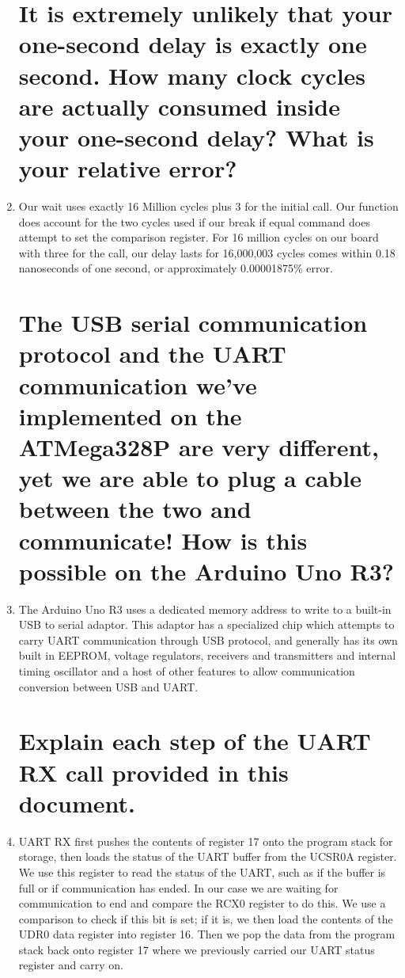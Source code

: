\documentclass[letterpaper,11pt]{texMemo} %
\begin{document}
\begin{enumerate}

\section{It is extremely unlikely that your one-second delay is exactly one second. How many clock
cycles are actually consumed inside your one-second delay? What is your relative error?}

\item Our wait uses exactly 16 Million cycles plus 3 for the initial call. Our function does account for the two cycles used if our break if equal command does attempt to set the comparison register. For 16 million cycles on our board with three for the call, our delay lasts for 16,000,003 cycles comes within 0.18 nanoseconds of one second, or approximately 0.00001875\% error.

\section{The USB serial communication protocol and the UART communication we’ve implemented
on the ATMega328P are very different, yet we are able to plug a cable between the two and
communicate! How is this possible on the Arduino Uno R3?}

\item The Arduino Uno R3 uses a dedicated memory address to write to a built-in USB to serial adaptor. This adaptor has a specialized chip which attempts to carry UART communication through USB protocol, and generally has its own built in EEPROM, voltage regulators, receivers and transmitters and internal timing oscillator and a host of other features to allow communication conversion between USB and UART.

\section{Explain each step of the UART RX call provided in this document.}

\item UART RX first pushes the contents of register 17 onto the program stack for storage, then loads the status of the UART buffer from the UCSR0A register. We use this register to read the status of the UART, such as if the buffer is full or if communication has ended. In our case we are waiting for communication to end and compare the RCX0 register to do this. We use a comparison to check if this bit is set; if it is, we then load the contents of the UDR0 data register into register 16. Then we pop the data from the program stack back onto register 17 where we previously carried our UART status register and carry on.

\end{enumerate}
\end{document}
